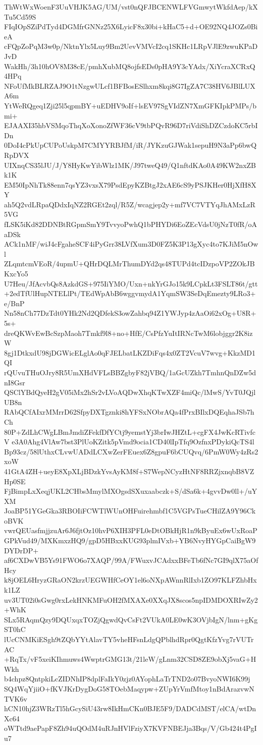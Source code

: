 ThWtWxWoenF3UuVHJK5AG/UM/vst0nQFJBCENWLFVGmwytWkfdAep/kXTu5Cd59S
FIqIOpSZiPdTyd4DGMfrGNNz25X6LyicF8x30bi+kHaC5+d+OE92NQ4JOZs0BieA
cFQpZoPqM3w0p/NktnYlx5Luy9Bm2UevVMVcI2cq1SKHc1LRpVJlE9zwuKPaDJvD
WakHh/3h10hOV8M38cE/pmhXubMQ8ojfsEDs0pHA9Y3cYAdx/XiYcraXCRxQ4HPq
NFoUfMkBLRZAJ9O1tNzgwULcf1BFBosESlhxm8kqi8G7IgZA7C38HV6JBlLUXA6m
YtWeRQgeq1Zji25l5qpmBY+uEDHV9oIf+lsEV97SgVIdZN7XmGFKIpkPMPs/bmi+
EJAAXI35hbVSMqoThqXoXonoZfWF36cV9tbPQvR96D7riVdiShDZCzdoKC5rbIDn
0DoI4cPkUpCUPoUskpM7CMYYRBJfM/iR/JYKzuGJWak1sepuH9N3aPp6bwQRpDVX
UIXnqCS35lJU/J/Y8HyKwYibWlz1MK/J97tweQ49/Q1nftdKAo0A49KW2nxZBk1K
EM50IpNhTk88enn7qsYZ3vxsX79PsdEpyKZBtgJ2xAE6cS9yPSJKHer0HjXfH8XY
ah5Q2vdLRpaQDdxIqNZ2RGEt2zql/R5Z/wcagjep2y+mf7VC7VTYqJhAMxLzR5VG
fLSK5iKd82DDNBtRGpmSmY9TvvyoPwhQ1bPHYDi6EoZEcVdsU0jNzT0fR/oAaDSk
ACk1nMF/wiJ4cFgaheSCF4iPyGrr38LVfXum3D0FZ5K3P13gXyc4to7KJiM5nOwl
ZLqmtcmVEoR/4upmU+QHrDQLMrThumDYd2qs48TUPd4tcIDzpoVP2ZOkJBKxcYo5
U7Heu/JfAcvbQs8AzkdGS+975IiYMO/Uxn+nkYrGJo15k9LCpkLt3FSLT86t/gtt
+2edTfUlHupNTELlPt/TEdWpAbB6wggvmydA1YqmSW3SeDqEmezty9LRo3+e/BnP
Nn58nCh77DzTdt0YHk2Nd2QDfekS3owZahbq94Z1YWJyp4zAaOi62xOg+U8R+5s+
dreQKWvEwBcSzpMaoh7Tmkf9l8+no+HfE/CsPfzYuItIRNcTwM6lobjggr2K8izW
8gj1DtkxdU98jDGWicELglAo0qFJELbatLKZDiFqs4x0ZT2VcuV7wvg+KkzMD1QI
rQUvuTHuOJry8R5UmXHdVFLsBBZgbyF82jVBQ/1aGcUZkh7TmhnQnDZw5dnI8Gsr
QSClYBdQyeH2gV05iMx2hSr2vLVoAQDwXhqKTwXZF4miQc/lMwS/YvT0JQjlUB8n
RAbQCfAIxrMMrrD62SfpyDXTgznki8hYFSxNObrAQa4fPrxBIlxDQEqhaJSb7hCh
80P+ZdLhCWgLBmJmdiZFekfDfYCtj9yemstYj3brIwJHZtL+cgFX4JwKcRTivfcV
e3A0Ahg4VlAw7bst3PlUoKZitk5pVmd9ocia1CD40lIpTfq9OzfnxPDykiQcTS4l
Bp93cz/58lUthxCLvwUADdLCXwZerFEuex6Z8gpuF6bCUQvq/6PmW0Wy4zRs2xoW
41GtA4ZH+ueyE8XpXLjBDzkYvsAyKM8f+S7WepNCyzHtNF8RRZjxnqbB8VZHp0SE
FjBimpLxXeqjUKL2CHbsMmylMXOgsdSXuxaabczk+S/dSa6k+4gvvDw0ll+/uYXM
JoaBP51YGeGka3RBOIiFCWTlWUnOHFuirehmbf1C5VGPsTueCHilZA9Y96CkoBVK
vwrQEUasfmjjzuAr6J6fjtOz10hvP6XIH3PFL0eDtOBkHjR1n9kByuEx6wUxRoaP
GPkVud49/MXKmxzHQ9/gpD5HBxxKUG93plmIVxb+YB6NvyHYGpCaiBgW9DYDrDP+
af6CXDwVB5Ys91FWO6o7XAQP/99A/FWuxvJCAdxxBFeTb6fNc7GI9qlX75aOfHcy
k8jOEL6HryzGRaON2krzUEGWHfCeOY1el6oNXpAWnnRlIxb1ZO97KLFZhbHxk1LZ
uv3UT02i0sGwg0rxLekHNKMFuOH2fMXAXe0XXqJX8scos5npIDMDOXRIwZy2+WhK
SLx5RAqmQzy9DQUxqxTOZjQgwdQvCsFt2VUkA0LE0wK3OVjbIgN/lnm+gKgST0hC
lUcCNMKiESgh9tZQbYYtAlavTY5vheHFsnLdgQPblhdRpr0QgtKfzYvg7rVUTrAC
+RqTx/vF5xeiKIhmuws4WwptrGMG13t/21leW/gLnm32CSD8ZE9obXj5vaG+HWkh
b4chpz8QntpkiLcZIDNhIP8dplFaIkY0zjz0AYophLaTrTND2o07BvyoNWI6K99j
SQ4WqYjiiO+fKVJKrDygDoG58TOebMaqypw+ZUpYrVmfMtoy1nBdArazvwNTVK6v
hCN10hjZ3WRzTl5hGcySiU43rw8IkHmCKn0BJE5F9/DADCdMST/elCA/wtDnXc64
oWTtd9aePapF8Zh94uQOdM4uRJnHVlFziyX7KVFNBEJja3Bqs/V/Gb424t4PgIu7
